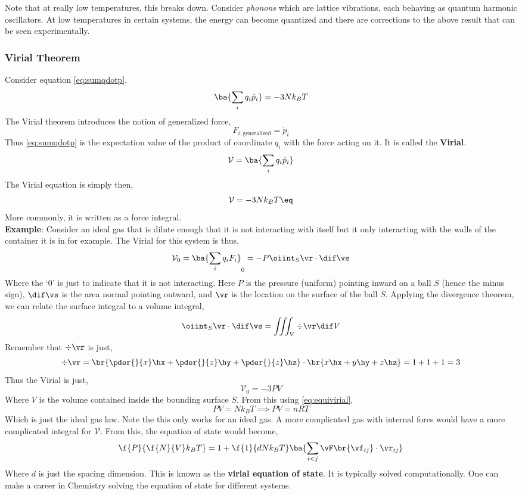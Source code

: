 \documentclass{article}
\begin{document}
{Note that at really low temperatures, this breaks down. Consider \textit{phonons} which are lattice vibrations, each behaving as quantum harmonic oscillators. At low temperatures in certain systems, the energy can become quantized and there are corrections to the above result that can be seen experimentally.

\subsubsection{Virial Theorem}

Consider equation \eqref{eq:sumqdotp},
\[ \ba{\sum_i q_i \dot{p}_i} = -3 N k_B T  \]
The Virial theorem introduces the notion of generalized force,
\[ F_{i,\text{generalized}} = \dot{p}_i \]
Thus \eqref{eq:sumqdotp} is the expectation value of the product of coordinate $q_i$ with the force acting on it. It is called the \textbf{Virial}.
\[ \mathcal{V} = \ba{\sum_i q_i \dot{p}_i} \]
The Virial equation is simply then,
\[ \mathcal{V} = -3 N k_B T \eq \label{eq:equivirial} \]
More commonly, it is written as a force integral. \\

\textbf{Example}: Consider an ideal gas that is dilute enough that it is not interacting with itself but it only interacting with the walls of the container it is in for example. The Virial for this system is thus,
\[ \mathcal{V}_0 = \ba{\sum_i q_i F_i}_0  = - P \oiint_S \vr \cdot \dif \vs\]
Where the `$0$' is just to indicate that it is not interacting. Here $P$ is the pressure (uniform) pointing inward on a ball $S$ (hence the minus sign), $\dif \vs$ is the area normal pointing outward, and $\vr$ is the location on the surface of the ball $S$. Applying the divergence theorem, we can relate the surface integral to a volume integral,
\[ \oiint_S \vr \cdot \dif \vs = \iiint_V \div \vr \dif V  \]
Remember that $\div \vr$ is just,
\[ \div \vr = \br{\pder{}{x}\hx + \pder{}{z}\hy + \pder{}{z}\hz} \cdot \br{ x \hx + y\hy + z\hz } = 1 + 1 + 1 = 3 \]
Thus the Virial is just,
\[ \mathcal{V}_0 = - 3 PV \]
Where $V$ is the volume contained inside the bounding surface $S$. From this using \eqref{eq:equivirial},
\[ PV = N k_B T  \implies PV = nRT \]
Which is just the ideal gas law. Note the this only works for an ideal gas. A more complicated gas with internal fores would have a more complicated integral for $\mathcal{V}$. From this, the equation of state would become,
\[ \f{P}{\f{N}{V} k_B T} = 1 + \f{1}{dNk_B T} \ba{\sum_{i<j} \vF\br{\vf_{ij}}\cdot \vr_{ij}}  \]
Where $d$ is just the spacing dimension. This is known as the \textbf{virial equation of state}. It is typically solved computationally. One can make a career in Chemistry solving the equation of state for different systems.

}
\end{document}

